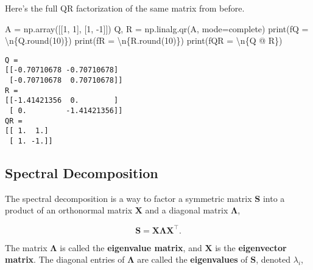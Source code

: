 \documentclass[
  letterpaper,
  DIV=11,
  numbers=noendperiod]{scrreprt}
\newenvironment{Shaded}{\begin{snugshade}}{\end{snugshade}}
\newcommand{\BuiltInTok}[1]{\textcolor[rgb]{0.00,0.23,0.31}{#1}}
\newcommand{\CharTok}[1]{\textcolor[rgb]{0.13,0.47,0.30}{#1}}
\newcommand{\DecValTok}[1]{\textcolor[rgb]{0.68,0.00,0.00}{#1}}
\newcommand{\NormalTok}[1]{\textcolor[rgb]{0.00,0.23,0.31}{#1}}
\newcommand{\OperatorTok}[1]{\textcolor[rgb]{0.37,0.37,0.37}{#1}}
\newcommand{\SpecialCharTok}[1]{\textcolor[rgb]{0.37,0.37,0.37}{#1}}
\newcommand{\SpecialStringTok}[1]{\textcolor[rgb]{0.13,0.47,0.30}{#1}}
\newcommand{\StringTok}[1]{\textcolor[rgb]{0.13,0.47,0.30}{#1}}
\begin{document}
Here's the full QR factorization of the same matrix from before.

\begin{Shaded}
\begin{Highlighting}[]
\NormalTok{A }\OperatorTok{=}\NormalTok{ np.array([[}\DecValTok{1}\NormalTok{, }\DecValTok{1}\NormalTok{], }
\NormalTok{              [}\DecValTok{1}\NormalTok{, }\OperatorTok{{-}}\DecValTok{1}\NormalTok{]])}
\NormalTok{Q, R }\OperatorTok{=}\NormalTok{ np.linalg.qr(A, mode}\OperatorTok{=}\StringTok{\textquotesingle{}complete\textquotesingle{}}\NormalTok{)}
\BuiltInTok{print}\NormalTok{(}\SpecialStringTok{f\textquotesingle{}Q = }\CharTok{\textbackslash{}n}\SpecialCharTok{\{}\NormalTok{Q}\SpecialCharTok{.}\BuiltInTok{round}\NormalTok{(}\DecValTok{10}\NormalTok{)}\SpecialCharTok{\}}\SpecialStringTok{\textquotesingle{}}\NormalTok{)}
\BuiltInTok{print}\NormalTok{(}\SpecialStringTok{f\textquotesingle{}R = }\CharTok{\textbackslash{}n}\SpecialCharTok{\{}\NormalTok{R}\SpecialCharTok{.}\BuiltInTok{round}\NormalTok{(}\DecValTok{10}\NormalTok{)}\SpecialCharTok{\}}\SpecialStringTok{\textquotesingle{}}\NormalTok{)}
\BuiltInTok{print}\NormalTok{(}\SpecialStringTok{f\textquotesingle{}QR = }\CharTok{\textbackslash{}n}\SpecialCharTok{\{}\NormalTok{Q }\OperatorTok{@}\NormalTok{ R}\SpecialCharTok{\}}\SpecialStringTok{\textquotesingle{}}\NormalTok{)}
\end{Highlighting}
\end{Shaded}

\begin{verbatim}
Q = 
[[-0.70710678 -0.70710678]
 [-0.70710678  0.70710678]]
R = 
[[-1.41421356  0.        ]
 [ 0.         -1.41421356]]
QR = 
[[ 1.  1.]
 [ 1. -1.]]
\end{verbatim}

\hypertarget{spectral-decomposition}{%
\subsection{Spectral Decomposition}\label{spectral-decomposition}}

The spectral decomposition is a way to factor a symmetric matrix
\(\mathbf{S}\) into a product of an orthonormal matrix \(\mathbf{X}\)
and a diagonal matrix \(\mathbf{\Lambda}\),

\[\mathbf{S} = \mathbf{X \Lambda X}^\top.\]

The matrix \(\mathbf{\Lambda}\) is called the \textbf{eigenvalue
matrix}, and \(\mathbf{X}\) is the \textbf{eigenvector matrix}. The
diagonal entries of \(\mathbf{\Lambda}\) are called the
\textbf{eigenvalues} of \(\mathbf{S}\), denoted \(\lambda_i\),
\end{document}
